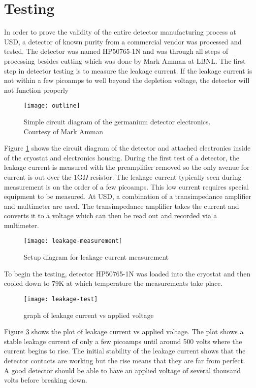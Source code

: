 \section{Testing}
In order to prove the validity of the entire detector manufacturing process at USD, a detector of known purity from a commercial vendor was processed and tested.
The detector was named HP50765-1N and was through all steps of processing besides cutting which was done by Mark Amman at LBNL.
The first step in detector testing is to measure the leakage current.
If the leakage current is not within a few picoamps to well beyond the depletion voltage, the detector will not function properly
\begin{figure}[htpb]
\centering
\texttt{[image: outline]}
\caption{Simple circuit diagram of the germanium detector electronics. Courtesy of Mark Amman}
\label{fig:outline}
\end{figure}
Figure \ref{fig:outline} shows the circuit diagram of the detector and attached electronics inside of the cryostat and electronics housing.
During the first test of a detector, the leakage current is measured with the preamplifier removed so the only avenue for current is out over the 1G$\Omega$ resistor.
The leakage current typically seen during measurement is on the order of a few picoamps.
This low current requires special equipment to be measured.
At USD, a combination of a transimpedance amplifier and multimeter are used.
The transimpedance amplifier takes the current and converts it to a voltage which can then be read out and recorded via a multimeter.
\begin{figure}[htpb]
\centering
\texttt{[image: leakage-measurement]}
\caption{Setup diagram for leakage current measurement}
\label{fig:leakage-measurement}
\end{figure}

To begin the testing, detector HP50765-1N was loaded into the cryostat and then cooled down to 79K at which temperature the measurements take place.
\begin{figure}[htpb]
\centering
\texttt{[image: leakage-test]}
\caption{graph of leakage current vs applied voltage}
\label{fig:leakage-test}
\end{figure}
Figure \ref{fig:leakage-test} shows the plot of leakage current vs applied voltage.
The plot shows a stable leakage current of only a few picoamps until around 500 volts where the current begins to rise.
The initial stability of the leakage current shows that the detector contacts are working but the rise means that they are far from perfect.
A good detector should be able to have an applied voltage of several thousand volts before breaking down.

